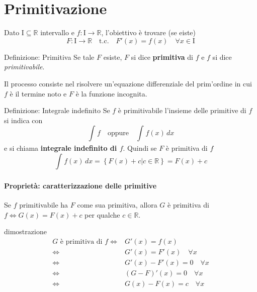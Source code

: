 \documentclass[x11names]{article}
\begin{document}
	\newpage
	\section{Primitivazione}
	Dato $\text{I} \subseteq \mathbb{R}$ intervallo e $f:\text{I} \to \mathbb{R}$, l'obiettivo è  trovare (se eiste)
	\[
	F: \text{I} \to \mathbb{R} \quad \text{t.c.} \quad F'(x) = f(x) \quad \forall x \in \text{I}
	\]
	
		\begin{center}
		\colorbox{myblue}{\begin{minipage}{5.75in}
				\begin{blues}{Definizione: Primitiva}
					Se tale $F$ esiste, $F$ si dice \textbf{primitiva} di $f$ e $f$ si dice \textit{primitivabile}. 
				\end{blues}
		\end{minipage}}       
	\end{center}
	Il processo consiste nel risolvere un'equazione differenziale del prim'ordine in cui $f$ è il termine noto e $F$ è la funzione incognita.
	
		\begin{center}
		\colorbox{myblue}{\begin{minipage}{5.75in}
				\begin{blues}{Definizione: Integrale indefinito}
					Se $f$ è primitivabile l'insieme delle primitive di $f$ si indica con 
					\[
					\int_{}^{}f \quad \text{oppure} \quad \int_{}^{}f(x) \,dx
					\]
					e si chiama \textbf{integrale indefinito di $f$}. Quindi se  $F$ è primitiva di $f$
					\[
					\int_{}^{}f(x) \,dx  = \left\{F(x) + c | c \in \mathbb{R}\right\} = F(x) + c
					\]
				\end{blues}
		\end{minipage}}       
	\end{center}
	\paragraph{Proprietà: caratterizzazione delle primitive}
	Se $f$ primitivabile ha $F$ come sua primitiva, allora $G$ è primitiva di $f \Longleftrightarrow G(x) = F(x) + c$ per qualche $c \in \mathbb{R}$.
	
	\begin{es}{dimostrazione}	
		\begin{align*}
			G \text{ è primitiva di } f \Longleftrightarrow& G'(x) = f(x) \\
			\Longleftrightarrow& G'(x) = F'(x) \quad \forall x \\
			\Longleftrightarrow& G'(x) - F'(x) = 0 \quad \forall x \\
			\Longleftrightarrow& \left(G - F\right)'(x) = 0 \quad \forall x \\
			\Longleftrightarrow& G(x) - F(x) = c \quad \forall x 
		\end{align*}
	\end{es}
	
\end{document}
